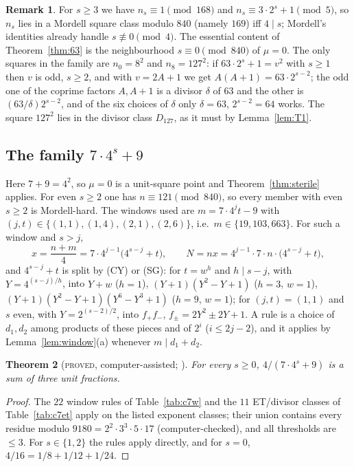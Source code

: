\documentclass[11pt,reqno]{amsart}
\newtheorem{theorem}{Theorem}[section]
\theoremstyle{definition}
\newtheorem{remark}[theorem]{Remark}
\newcommand{\status}[1]{\textup{\textsc{#1}}}
\begin{document}
\begin{remark}\label{rem:63}
For $s\ge3$ we have $n_s\equiv1\pmod{168}$ and $n_s\equiv3\cdot2^s+1\pmod5$,
so $n_s$ lies in a Mordell square class modulo $840$ (namely $169$) iff
$4\mid s$; Mordell's
identities already handle $s\not\equiv0\pmod4$.  The essential content of
Theorem~\ref{thm:63} is the neighbourhood $s\equiv0\pmod{840}$ of $\mu=0$.
The only squares in the family are $n_0=8^2$ and $n_8=127^2$: if
$63\cdot2^s+1=v^2$ with $s\ge1$ then $v$ is odd, $s\ge2$, and with $v=2A+1$ we
get $A(A+1)=63\cdot2^{s-2}$; the odd one of the coprime factors $A,A+1$ is a
divisor $\delta$ of $63$ and the other is $(63/\delta)2^{s-2}$, and of the six
choices of $\delta$ only $\delta=63$, $2^{s-2}=64$ works.  The square $127^2$
lies in the divisor class $D_{127}$, as it must by Lemma~\ref{lem:T1}.
\end{remark}

\subsection{The family $7\cdot4^s+9$}

Here $7+9=4^2$, so $\mu=0$ is a unit-square point and
Theorem~\ref{thm:sterile} applies.  For even $s\ge2$ one has
$n\equiv121\pmod{840}$, so every member with even $s\ge2$ is Mordell-hard.
The windows used are $m=7\cdot4^jt-9$ with $(j,t)\in\{(1,1),(1,4),(2,1),(2,6)\}$,
i.e.\ $m\in\{19,103,663\}$.  For such a window and $s>j$,
\[
 x=\frac{n+m}4=7\cdot4^{j-1}\bigl(4^{s-j}+t\bigr),\qquad N=nx=4^{j-1}\cdot7\cdot n\cdot\bigl(4^{s-j}+t\bigr),
\]
and $4^{s-j}+t$ is split by (CY) or (SG): for $t=w^h$ and $h\mid s-j$, with
$Y=4^{(s-j)/h}$, into $Y+w$ ($h=1$), $(Y+1)(Y^2-Y+1)$ ($h=3$, $w=1$),
$(Y+1)(Y^2-Y+1)(Y^6-Y^3+1)$ ($h=9$, $w=1$); for $(j,t)=(1,1)$ and $s$ even,
with $Y=2^{(s-2)/2}$, into $f_+f_-$, $f_\pm=2Y^2\pm2Y+1$.  A rule is a choice
of $d_1,d_2$ among products of these pieces and of $2^i$ ($i\le 2j-2$), and it
applies by Lemma~\ref{lem:window}(a) whenever $m\mid d_1+d_2$.

\begin{theorem}[\status{proved}, computer-assisted; {\cite[Thm.~2.6]{Exp105}}]\label{thm:c7}
For every $s\ge0$, $4/(7\cdot4^s+9)$ is a sum of three unit fractions.
\end{theorem}

\begin{proof}
The $22$ window rules of Table~\ref{tab:c7w} and the $11$ ET/divisor
classes of Table~\ref{tab:c7et} apply on the listed exponent classes; their
union contains every residue modulo $9180=2^2\cdot3^3\cdot5\cdot17$
(computer-checked), and all thresholds are $\le3$.  For $s\in\{1,2\}$ the
rules apply directly, and for $s=0$, $4/16=1/8+1/12+1/24$.
\end{proof}
\end{document}
